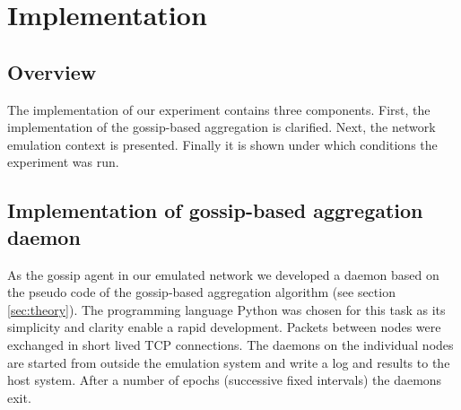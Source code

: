 \section{Implementation}
\label{sec:implementation}
\subsection{Overview}
The implementation of our experiment contains three components. First, the implementation of the gossip-based aggregation is clarified. Next, the network emulation context is presented. Finally it is shown under which conditions the experiment was run.

\subsection{Implementation of gossip-based aggregation daemon}
As the gossip agent in our emulated network we developed a daemon based on the pseudo code of the gossip-based aggregation algorithm (see section \ref{sec:theory}). The programming language Python \cite{python} was chosen for this task as its simplicity and clarity enable a rapid development. Packets between nodes were exchanged in short lived TCP connections. The daemons on the individual nodes are started from outside the emulation system and write a log and results to the host system. After a number of epochs (successive fixed intervals) the daemons exit.

